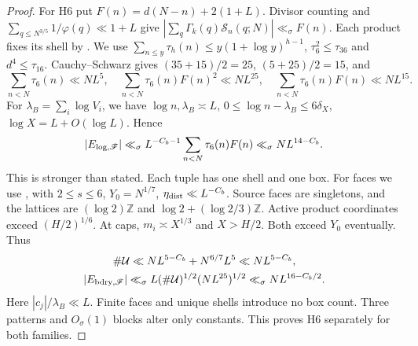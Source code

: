 \begin{proof}
For H6 put $F(n)=d(N-n)+2(1+L)$.
Divisor counting and $\sum_{q\le N^{3/5}}1/\varphi(q)\ll1+L$ give
$|\sum_q\Gamma_k(q)\mathcal S_n(q;N)|\ll_\sigma F(n)$.
Each product fixes its shell by \cite[(B.11)]{Z1}.
We use $\sum_{n\le y}\tau_h(n)\le y(1+\log y)^{h-1}$,
$\tau_6^2\le\tau_{36}$ and $d^4\le\tau_{16}$.
Cauchy--Schwarz gives $(35+15)/2=25$, $(5+25)/2=15$, and
\[
 \sum_{n<N}\tau_6(n)\ll NL^5,\quad
 \sum_{n<N}\tau_6(n)F(n)^2\ll NL^{25},\quad
 \sum_{n<N}\tau_6(n)F(n)\ll NL^{15}.
\]
For $\lambda_B=\sum_i\log V_i$, we have
$\log n,\lambda_B\asymp L$, $0\le\log n-\lambda_B\le6\delta_X$,
$\log X=L+O(\log L)$.
Hence
\[
 |E_{\rm log,\mathscr F}|\ll_\sigma
 L^{-C_b-1}\sum_{n<N}\tau_6(n)F(n)\ll_\sigma NL^{14-C_b}.
\]
This is stronger than stated.
Each tuple has one shell and one box.
For faces we use \cite[Lemma~B.2, (B.14)--(B.16)]{Z1}, with
$2\le s\le6$, $Y_0=N^{1/7}$, $\eta_{\rm dist}\ll L^{-C_b}$.
Source faces are singletons, and the lattices are
$(\log2)\mathbb Z$ and $\log2+(\log2/3)\mathbb Z$.
Active product coordinates exceed $(H/2)^{1/6}$.
At caps, $m_i\asymp X^{1/3}$ and $X>H/2$.
Both exceed $Y_0$ eventually. Thus
\[
\begin{gathered}
 \#\mathcal U\ll NL^{5-C_b}+N^{6/7}L^5\ll NL^{5-C_b},\\
 |E_{\rm bdry,\mathscr F}|\ll_\sigma
 L(\#\mathcal U)^{1/2}(NL^{25})^{1/2}\ll_\sigma NL^{16-C_b/2}.
\end{gathered}
\]
Here $|c_j|/\lambda_B\ll L$.
Finite faces and unique shells introduce no box count.
Three patterns and $O_\sigma(1)$ blocks alter only constants.
This proves H6 separately for both families.


\end{proof}
